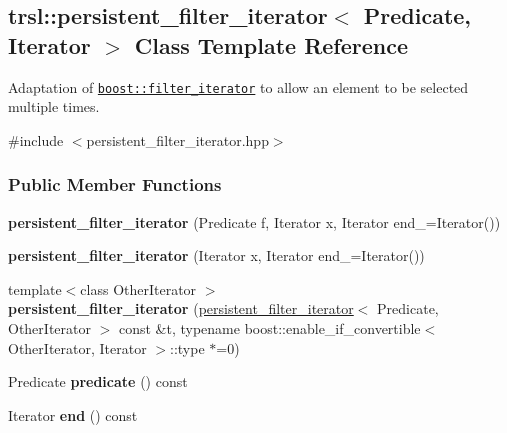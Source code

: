 \hypertarget{classtrsl_1_1persistent__filter__iterator}{
\subsection{trsl::persistent\_\-filter\_\-iterator$<$ Predicate, Iterator $>$ Class Template Reference}
\label{classtrsl_1_1persistent__filter__iterator}
}


Adaptation of \href{http://www.boost.org/libs/iterator/doc/filter_iterator.html}{\tt boost::filter\_\-iterator} to allow an element to be selected multiple times.  


{\ttfamily \#include $<$persistent\_\-filter\_\-iterator.hpp$>$}\subsubsection*{Public Member Functions}
\begin{DoxyCompactItemize}
\item 
\hypertarget{classtrsl_1_1persistent__filter__iterator_a30c6e3dba482f0820114287eabdcd534}{
{\bfseries persistent\_\-filter\_\-iterator} (Predicate f, Iterator x, Iterator end\_\-=Iterator())}
\label{classtrsl_1_1persistent__filter__iterator_a30c6e3dba482f0820114287eabdcd534}

\item 
\hypertarget{classtrsl_1_1persistent__filter__iterator_a47b88fccfeb56e738cac4c1dc5bf7a2c}{
{\bfseries persistent\_\-filter\_\-iterator} (Iterator x, Iterator end\_\-=Iterator())}
\label{classtrsl_1_1persistent__filter__iterator_a47b88fccfeb56e738cac4c1dc5bf7a2c}

\item 
\hypertarget{classtrsl_1_1persistent__filter__iterator_a6a1017615cc3f74632dc78c1f673f078}{
{\footnotesize template$<$class OtherIterator $>$ }\\{\bfseries persistent\_\-filter\_\-iterator} (\hyperlink{classtrsl_1_1persistent__filter__iterator}{persistent\_\-filter\_\-iterator}$<$ Predicate, OtherIterator $>$ const \&t, typename boost::enable\_\-if\_\-convertible$<$ OtherIterator, Iterator $>$::type $\ast$=0)}
\label{classtrsl_1_1persistent__filter__iterator_a6a1017615cc3f74632dc78c1f673f078}

\item 
\hypertarget{classtrsl_1_1persistent__filter__iterator_ada83003c314dea2661589bfb2ce1e293}{
Predicate {\bfseries predicate} () const }
\label{classtrsl_1_1persistent__filter__iterator_ada83003c314dea2661589bfb2ce1e293}

\item 
\hypertarget{classtrsl_1_1persistent__filter__iterator_a2b4e55f9f024dc22a6a7288d3ef53b2c}{
Iterator {\bfseries end} () const }
\label{classtrsl_1_1persistent__filter__iterator_a2b4e55f9f024dc22a6a7288d3ef53b2c}

\end{DoxyCompactItemize}
